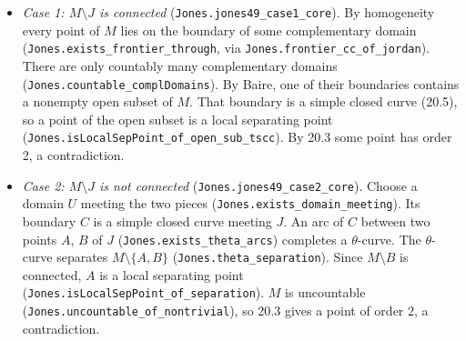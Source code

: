 \documentclass[11pt]{article}
\newcommand{\lean}[1]{\texttt{#1}}
\begin{document}
\begin{itemize}
  \item \emph{Case 1: $M \setminus J$ is connected} (\lean{Jones.\hspace{0pt}jones49\_\hspace{0pt}case1\_\hspace{0pt}core}). By homogeneity every point of $M$ lies on the boundary of some complementary domain (\lean{Jones.\hspace{0pt}exists\_\hspace{0pt}frontier\_\hspace{0pt}through}, via \lean{Jones.\hspace{0pt}frontier\_\hspace{0pt}cc\_\hspace{0pt}of\_\hspace{0pt}jordan}). There are only countably many complementary domains (\lean{Jones.\hspace{0pt}countable\_\hspace{0pt}complDomains}). By Baire, one of their boundaries contains a nonempty open subset of $M$. That boundary is a simple closed curve (20.5), so a point of the open subset is a local separating point (\lean{Jones.\hspace{0pt}isLocalSepPoint\_\hspace{0pt}of\_\hspace{0pt}open\_\hspace{0pt}sub\_\hspace{0pt}tscc}). By 20.3 some point has order 2, a contradiction.
  \item \emph{Case 2: $M \setminus J$ is not connected} (\lean{Jones.\hspace{0pt}jones49\_\hspace{0pt}case2\_\hspace{0pt}core}). Choose a domain $U$ meeting the two pieces (\lean{Jones.\hspace{0pt}exists\_\hspace{0pt}domain\_\hspace{0pt}meeting}). Its boundary $C$ is a simple closed curve meeting $J$. An arc of $C$ between two points $A$, $B$ of $J$ (\lean{Jones.\hspace{0pt}exists\_\hspace{0pt}theta\_\hspace{0pt}arcs}) completes a $\theta$-curve. The $\theta$-curve separates $M \setminus \{A, B\}$ (\lean{Jones.\hspace{0pt}theta\_\hspace{0pt}separation}). Since $M \setminus B$ is connected, $A$ is a local separating point (\lean{Jones.\hspace{0pt}isLocalSepPoint\_\hspace{0pt}of\_\hspace{0pt}separation}). $M$ is uncountable (\lean{Jones.\hspace{0pt}uncountable\_\hspace{0pt}of\_\hspace{0pt}nontrivial}), so 20.3 gives a point of order 2, a contradiction.
\end{itemize}
\end{document}
